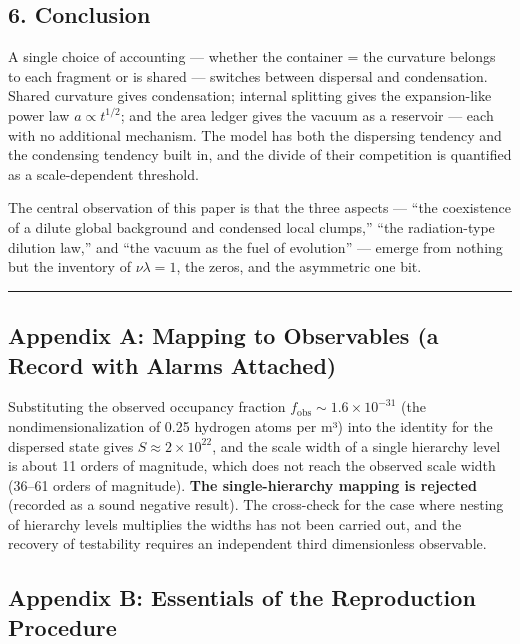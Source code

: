 \documentclass[
]{article}
\begin{document}
\subsection{6. Conclusion}\label{conclusion}

A single choice of accounting --- whether the container = the curvature
belongs to each fragment or is shared --- switches between dispersal and
condensation. Shared curvature gives condensation; internal splitting
gives the expansion-like power law \(a\propto t^{1/2}\); and the area
ledger gives the vacuum as a reservoir --- each with no additional
mechanism. The model has both the dispersing tendency and the condensing
tendency built in, and the divide of their competition is quantified as
a scale-dependent threshold.

The central observation of this paper is that the three aspects ---
``the coexistence of a dilute global background and condensed local
clumps,'' ``the radiation-type dilution law,'' and ``the vacuum as the
fuel of evolution'' --- emerge from nothing but the inventory of
\(\nu\lambda=1\), the zeros, and the asymmetric one bit.

\begin{center}\rule{0.5\linewidth}{0.5pt}\end{center}

\subsection{Appendix A: Mapping to Observables (a Record with Alarms
Attached)}\label{appendix-a-mapping-to-observables-a-record-with-alarms-attached}

Substituting the observed occupancy fraction
\(f_{\mathrm{obs}}\sim1.6\times10^{-31}\) (the nondimensionalization of
0.25 hydrogen atoms per m³) into the identity for the dispersed state
gives \(S\approx2\times10^{22}\), and the scale width of a single
hierarchy level is about 11 orders of magnitude, which does not reach
the observed scale width (36--61 orders of magnitude). \textbf{The
single-hierarchy mapping is rejected} (recorded as a sound negative
result). The cross-check for the case where nesting of hierarchy levels
multiplies the widths has not been carried out, and the recovery of
testability requires an independent third dimensionless observable.

\subsection{Appendix B: Essentials of the Reproduction
Procedure}\label{appendix-b-essentials-of-the-reproduction-procedure}
\end{document}
